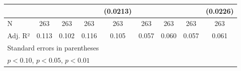{\begin{tabular}{l*{8}{c}}
                    &                     &                     &                     &    (0.0213)         &                     &                     &                     &    (0.0226)         \\
\hline
N                   &         263         &         263         &         263         &         263         &         263         &         263         &         263         &         263         \\
Adj. R²             &       0.113         &       0.102         &       0.116         &       0.105         &       0.057         &       0.060         &       0.057         &       0.061         \\
\hline\hline
\multicolumn{9}{l}{\footnotesize Standard errors in parentheses}\\
\multicolumn{9}{l}{\footnotesize \sym{*} \(p<0.10\), \sym{**} \(p<0.05\), \sym{***} \(p<0.01\)}\\
\end{tabular}
}
